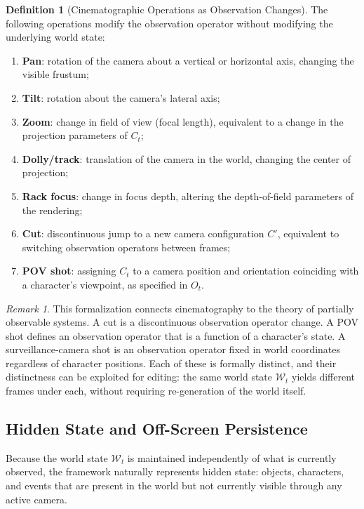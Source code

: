 \documentclass[11pt,a4paper]{article}
\theoremstyle{plain}
\theoremstyle{definition}
\newtheorem{definition}[theorem]{Definition}
\theoremstyle{remark}
\newtheorem{remark}[theorem]{Remark}
\begin{document}
\begin{definition}[Cinematographic Operations as Observation Changes]
The following operations modify the observation operator without modifying the underlying world state:
\begin{enumerate}[leftmargin=2em,itemsep=0pt]
\item \textbf{Pan}: rotation of the camera about a vertical or horizontal axis, changing the visible frustum;
\item \textbf{Tilt}: rotation about the camera's lateral axis;
\item \textbf{Zoom}: change in field of view (focal length), equivalent to a change in the projection parameters of $C_t$;
\item \textbf{Dolly/track}: translation of the camera in the world, changing the center of projection;
\item \textbf{Rack focus}: change in focus depth, altering the depth-of-field parameters of the rendering;
\item \textbf{Cut}: discontinuous jump to a new camera configuration $C'$, equivalent to switching observation operators between frames;
\item \textbf{POV shot}: assigning $C_t$ to a camera position and orientation coinciding with a character's viewpoint, as specified in $O_t$.
\end{enumerate}
\end{definition}

\begin{remark}
This formalization connects cinematography to the theory of partially observable systems. A cut is a discontinuous observation operator change. A POV shot defines an observation operator that is a function of a character's state. A surveillance-camera shot is an observation operator fixed in world coordinates regardless of character positions. Each of these is formally distinct, and their distinctness can be exploited for editing: the same world state $\mathcal{W}_t$ yields different frames under each, without requiring re-generation of the world itself.
\end{remark}

\subsection{Hidden State and Off-Screen Persistence}

Because the world state $\mathcal{W}_t$ is maintained independently of what is currently observed, the framework naturally represents hidden state: objects, characters, and events that are present in the world but not currently visible through any active camera.
\end{document}
